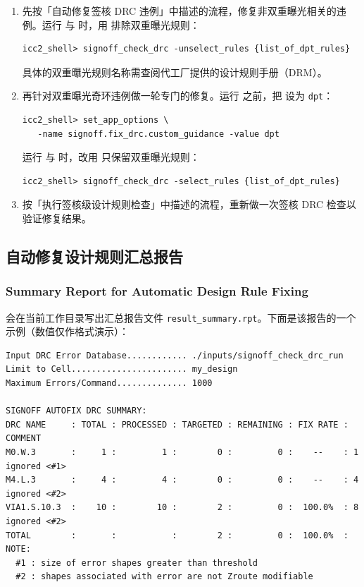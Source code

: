 \begin{enumerate}
  \item 先按「自动修复签核 DRC 违例」中描述的流程，修复非双重曝光相关的违例。运行  与  时，用  排除双重曝光规则：
\begin{lstlisting}
icc2_shell> signoff_check_drc -unselect_rules {list_of_dpt_rules}
\end{lstlisting}
        \begin{noteBox}
        具体的双重曝光规则名称需查阅代工厂提供的设计规则手册（DRM）。
        \end{noteBox}

  \item 再针对双重曝光奇环违例做一轮专门的修复。运行  之前，把  设为 \texttt{dpt}：
\begin{lstlisting}
icc2_shell> set_app_options \
   -name signoff.fix_drc.custom_guidance -value dpt
\end{lstlisting}
        运行  与  时，改用  只保留双重曝光规则：
\begin{lstlisting}
icc2_shell> signoff_check_drc -select_rules {list_of_dpt_rules}
\end{lstlisting}

  \item 按「执行签核级设计规则检查」中描述的流程，重新做一次签核 DRC 检查以验证修复结果。
\end{enumerate}

\subsection{自动修复设计规则汇总报告}
\subsubsection*{Summary Report for Automatic Design Rule Fixing}

 会在当前工作目录写出汇总报告文件 \texttt{result\_summary.rpt}。下面是该报告的一个示例（数值仅作格式演示）：

\begin{lstlisting}
Input DRC Error Database............ ./inputs/signoff_check_drc_run
Limit to Cell....................... my_design
Maximum Errors/Command.............. 1000

SIGNOFF AUTOFIX DRC SUMMARY:
DRC NAME     : TOTAL : PROCESSED : TARGETED : REMAINING : FIX RATE : COMMENT
M0.W.3       :     1 :         1 :        0 :         0 :    --    : 1 ignored <#1>
M4.L.3       :     4 :         4 :        0 :         0 :    --    : 4 ignored <#2>
VIA1.S.10.3  :    10 :        10 :        2 :         0 :  100.0%  : 8 ignored <#2>
TOTAL        :       :           :        2 :         0 :  100.0%  :
NOTE:
  #1 : size of error shapes greater than threshold
  #2 : shapes associated with error are not Zroute modifiable
\end{lstlisting}

